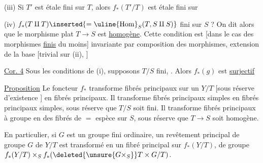 (iii) Si $T'$ est étale fini sur $T$, alors $f_*(T'/T)$ est étale fini sur 

(iv) $f_*(T\amalg T)\inserted{=\uline{\operatorname{Hom}}_S(T,S\amalg S)}$  fini sur $S$ ?
On dit alors que le morphisme  plat $T\to S$ est \uline{homogène}.  Cette condition est [dans le cas des morphismes \uline{finis} du moins] invariante par composition des morphismes, extension de la base [trivial sur (ii), ]


\uline{Cor. 4} Sous les conditions de (i), supposons $T/S$ fini,  . Alors $f_*(g)$ est \uline{surjectif}

\uline{Proposition} Le foncteur $f_*$ transforme fibrés  principaux sur un $Y/T$ [sous réserve d'existence ] en fibrés  principaux.
Il transforme fibrés principaux simples en fibrés principaux simples, sous réserve que $T/S$ soit fini.
Il transforme  fibrés principaux à groupe      en  des
fibrés de $=$ espèce sur $S$, sous réserve que $T\to S$ soit homogène.

En particulier, si $G$ est un groupe fini ordinaire, un  revêtement principal de groupe $G$ de $Y/T$ est transformé en un  fibré principal  sur $f_*(Y/T)$, de groupe $f_*(Y/T)\times_S f_*(\deleted{\unsure{G\times_S}}T\times G/T)$.

